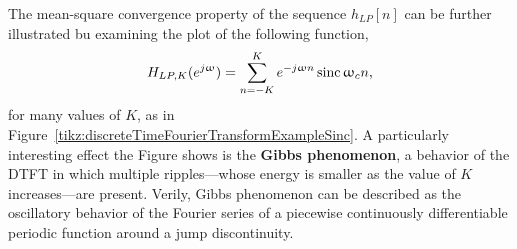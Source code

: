 \documentclass[\documentfontsize, twocolumn]{\classname}
\begin{document}
The mean-square convergence property of the sequence $h_{LP}[n]$ can be further illustrated bu examining the plot of the following function,
\[
    H_{LP,K}(e^{j\omega}) = \sum_{n=-K}^K e^{-j\omega n}\sinc {\omega_c n},
\]
for many values of $K$, as in Figure~\ref{tikz:discreteTimeFourierTransformExampleSinc}. A particularly interesting effect the Figure shows is the \textbf{Gibbs phenomenon}, a behavior of the DTFT in which multiple ripples---whose energy is smaller as the value of $K$ increases---are present. Verily, Gibbs phenomenon can be described as the oscillatory behavior of the Fourier series of a piecewise continuously differentiable periodic function around a jump discontinuity.
\begin{figure*}[ht]
\begin{center}
        \begin{tikzpicture}[
            declare function={fourier(\k,\x)=sin(0.4*\x*10 * \k)*(1/(3.1415*\k))*sin(-\x*0.4*10 *\k);}
            ]


\end{tikzpicture}
\end{center}
\end{figure*}
\end{document}
